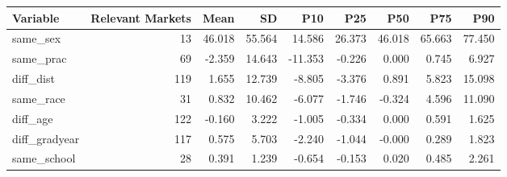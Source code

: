 \begin{table}[!h]
\centering
\begin{tabular}{lrrrrrrrr}
\toprule
Variable & Relevant Markets & Mean & SD & P10 & P25 & P50 & P75 & P90\\
\midrule
same\_sex & 13 & 46.018 & 55.564 & 14.586 & 26.373 & 46.018 & 65.663 & 77.450\\
same\_prac & 69 & -2.359 & 14.643 & -11.353 & -0.226 & 0.000 & 0.745 & 6.927\\
diff\_dist & 119 & 1.655 & 12.739 & -8.805 & -3.376 & 0.891 & 5.823 & 15.098\\
same\_race & 31 & 0.832 & 10.462 & -6.077 & -1.746 & -0.324 & 4.596 & 11.090\\
diff\_age & 122 & -0.160 & 3.222 & -1.005 & -0.334 & 0.000 & 0.591 & 1.625\\
\addlinespace
diff\_gradyear & 117 & 0.575 & 5.703 & -2.240 & -1.044 & -0.000 & 0.289 & 1.823\\
same\_school & 28 & 0.391 & 1.239 & -0.654 & -0.153 & 0.020 & 0.485 & 2.261\\
\bottomrule
\end{tabular}
\end{table}
